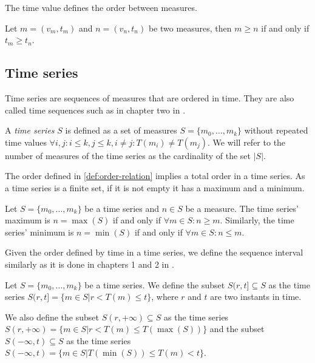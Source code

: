The time value defines the order between measures.

\begin{definition}
  \label{def:order-relation}
  Let $m=(v_m,t_m)$ and $n=(v_n,t_n)$ be two measures, then $m\geq n$
  if and only if $t_m\geq t_n$.
\end{definition}

\subsection{Time series}

Time series are sequences of measures that are ordered in time. They
are also called time sequences such as in chapter two in \cite{last}.

\begin{definition}
  A \emph{time series} $S$ is defined as a set of measures
  $S=\{m_0,\ldots,m_k\}$ without repeated time values $\forall i,j:
  i\leq k, j\leq k, i\neq j : T(m_i)\neq T(m_j)$. We will refer to the
  number of measures of the time series as the cardinality of the set
  $|S|$.
\end{definition}

The order defined in \ref{def:order-relation} implies a total order in
a time series. As a time series is a finite set, if it is not empty it
has a maximum and a minimum. 

\begin{definition}
  Let $S=\{m_0,\ldots,m_k\}$ be a time series and $n\in S$ be a
  measure. The time series' maximum is $n=\max(S)$ if and only if
  $\forall m \in S: n \geq m $.  Similarly, the time series' minimum
  is $n=\min(S)$ if and only if $\forall m \in S: n \leq m$.
\end{definition}

Given the order defined by time in a time series, we define the
sequence interval similarly as it is done in chapters 1 and 2 in \cite{last}.

\begin{definition}
  Let $S=\{m_0, \ldots, m_k\}$ be a time series. We define the subset
  $S(r,t] \subseteq S$ as the time series $S(r,t]=\{m\in S |
  r<T(m)\leq t\}$, where $r$ and $t$ are two instants in time.

  We also define the subset $S(r,+\infty)\subseteq S$ as the time
  series $S(r,+\infty) = \{m\in S | r< T(m) \leq T(\max(S))\}$ and the
  subset $S(-\infty,t)\subseteq S$ as the time series $S(-\infty,t) =
  \{m\in S | T(\min(S))\leq T(m) < t\}$.
\end{definition}

